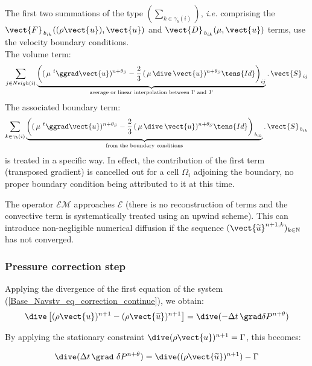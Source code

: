 The first two summations of the type $(\sum\limits_{k\in {\gamma_b(i)}})$,
{\it i.e.} comprising the $\vect{F}_{\,{b}_{ik}}((\rho \vect{u}),\vect{u})$ and
$\vect{D}_{\,{b}_{ik}}(\mu,\vect{u})$ terms, use the velocity boundary conditions.\\
The volume term:
\begin{equation}\notag
\sum\limits_{j\in Neigh(i)}{ \underbrace{\left((\,\mu\,\,^{t}\ggrad\vect{u})^{n+\theta_{S}}- \frac{2}{3}\,(\,\mu\, \dive\,\vect{u})^{n+\theta_{S}}\tens{Id}\right)_{ij}}_{\text{average or linear interpolation between I' and J'}}\text{.}\,\vect{S}_{\,ij}}\\
\end{equation}
The associated boundary term:
\begin{equation}\notag
\sum\limits_{k\in {\gamma_b(i)}}{ \underbrace{\left((\,\mu\,\,^{t}\ggrad\vect{u})^{n+\theta_{S}}- \frac{2}{3}\,(\,\mu\, \dive\,\vect{u})^{n+\theta_{S}}\tens{Id}\right)_{\,{b}_{ik}}}_\text{from the boundary conditions}\text{.}\,\vect{S}_{\,{b}_{ik}}}
\end{equation}
is treated in a specific way. In effect, the contribution of the first term
(transposed gradient) is cancelled out for a cell $\Omega_i$ adjoining the
boundary, no proper boundary condition being attributed to it at this time.

The operator $\mathcal{EM}$ approaches $\mathcal{E}$ (there is no reconstruction
of terms and the convective term is systematically treated using an upwind scheme).
This can introduce non-negligible numerical diffusion if the sequence
$(\vect{\widetilde{u}}^{n+1,k})_{k\in \mathbb{N}}$ has not converged.

\subsubsection*{\bf Pressure correction step}
Applying the divergence of the first equation of the system
(\ref{Base_Navstv_eq_correction_continue}), we obtain:
\begin{equation}
\dive\left[(\rho\vect{u})^{n+1}-(\rho\vect{\widetilde{u}})^{n+1}\right]
=\dive(-\Delta t\, \grad  \delta P^{n+\theta}) \\
\end{equation}

By applying the stationary constraint $\dive(\rho\vect{u})^{n+1}=\Gamma$,
this becomes:

\begin{equation}
\dive(\Delta t\, \grad\ \delta P^{n+\theta})=\dive((\rho \vect{\widetilde{u}})^{n+1})-\Gamma
\end{equation}

